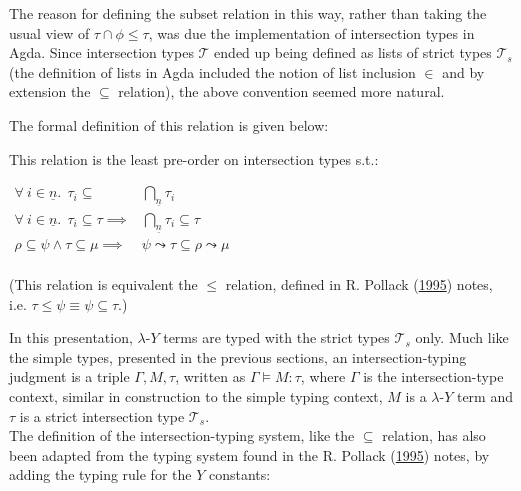 \documentclass[a4paper, 12pt, twoside]{style/ociamthesis}
\theoremstyle{plain}
\theoremstyle{definition}
\newtheorem{Definition}{Definition}[chapter]
\theoremstyle{remark}
\newtheorem*{Remark}{Remark}
\newcommand{\lamy}{\lambda\text{-}Y}
\newcommand{\taui}{\bigcap\nolimits_{\underline{n}} \tau_i}
\renewenvironment{Remark}{\begin{OldRemark}\begin{mdframed}[style=example, linecolor=black]}{\end{mdframed}\end{OldRemark}}
\renewenvironment{Definition}{\begin{OldDefinition}\begin{mdframed}[style=example, linecolor=cyan]}{\end{mdframed}\end{OldDefinition}}
\begin{document}
\(\ \)

\begin{Remark}

The reason for defining the subset relation in this way, rather than
taking the usual view of \(\tau \cap \phi \leq \tau\), was due the
implementation of intersection types in Agda. Since intersection types
\(\mathcal{T}\) ended up being defined as lists of strict types
\(\mathcal{T}_s\) (the definition of lists in Agda included the notion
of list inclusion \(\in\) and by extension the \(\subseteq\) relation),
the above convention seemed more natural.

\end{Remark}

The formal definition of this relation is given below:

\begin{Definition}[$\subseteq$]

\label{Definition:subseteqOrig} This relation is the least pre-order on
intersection types s.t.:

\begin{center}
$\begin{aligned}
\forall\ i \in \underline{n}.\ \ \tau_i \subseteq& \taui \\ 
\forall\ i \in \underline{n}.\ \ \tau_i \subseteq \tau \implies& \taui \subseteq \tau \\
\rho \subseteq \psi \land \tau \subseteq \mu \implies& \psi \leadsto \tau \subseteq \rho \leadsto \mu\\
\end{aligned}$
\end{center}

(This relation is equivalent the \(\leq\) relation, defined in R.
Pollack (\protect\hyperlink{ref-pollack95}{1995}) notes, i.e.
\(\tau \leq \psi \equiv \psi \subseteq \tau\).)

\end{Definition}

In this presentation, \(\lamy\) terms are typed with the strict types
\(\mathcal{T}_s\) only. Much like the simple types, presented in the
previous sections, an intersection-typing judgment is a triple
\(\Gamma, M, \tau\), written as \(\Gamma \vDash M : \tau\), where
\(\Gamma\) is the intersection-type context, similar in construction to
the simple typing context, \(M\) is a \(\lamy\) term and \(\tau\) is a
strict intersection type \(\mathcal{T}_s\).\\
The definition of the intersection-typing system, like the \(\subseteq\)
relation, has also been adapted from the typing system found in the R.
Pollack (\protect\hyperlink{ref-pollack95}{1995}) notes, by adding the
typing rule for the \(Y\) constants:
\end{document}
